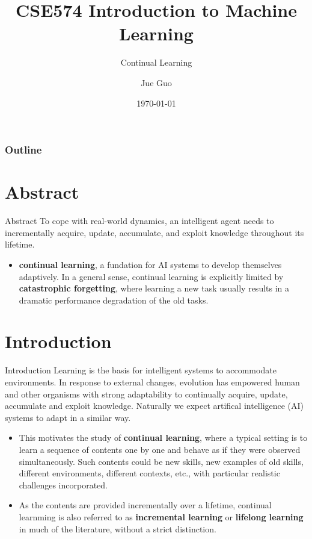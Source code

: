 \documentclass[10pt,dvipsnames]{beamer}
\title{CSE574 Introduction to Machine Learning}
\subtitle{Continual Learning}
\author{Jue Guo}
\institute{University at Buffalo}
\date{\today}
\begin{document}
\begin{frame}
    \titlepage
\end{frame}

\begin{frame}
    \frametitle{Outline}
    \tableofcontents
\end{frame}

\section{Abstract}
\begin{frame}{Abstract}
    To cope with real-world dynamics, an intelligent agent needs to incrementally acquire, update, accumulate, and exploit knowledge throughout its lifetime.
    \begin{itemize}
        \item \textbf{continual learning}, a fundation for AI systems to develop themselves adaptively. In a general sense, continual learning is explicitly limited by \textbf{catastrophic forgetting}, where learning a new task usually results in a dramatic performance degradation of the old tasks.
    \end{itemize}
\end{frame}

\section{Introduction}
\begin{frame}{Introduction}
    Learning is the basis for intelligent systems to accommodate environments. In response to external changes, evolution has empowered human and other organisms with strong adaptability to continually acquire, update, accumulate and exploit knowledge. Naturally we expect artifical intelligence (AI) systems to adapt in a similar way.
    \begin{itemize}
        \item This motivates the study of \textbf{continual learning}, where a typical setting is to learn a sequence of contents one by one and behave as if they were observed simultaneously. Such contents could be new skills, new examples of old skills, different environments, different contexts, etc., with particular realistic challenges incorporated.
        \item As the contents are provided incrementally over a lifetime, continual learnming is also referred to as \textbf{incremental learning} or \textbf{lifelong learning} in much of the literature, without a strict distinction.
    \end{itemize}
\end{frame}
\end{document}
